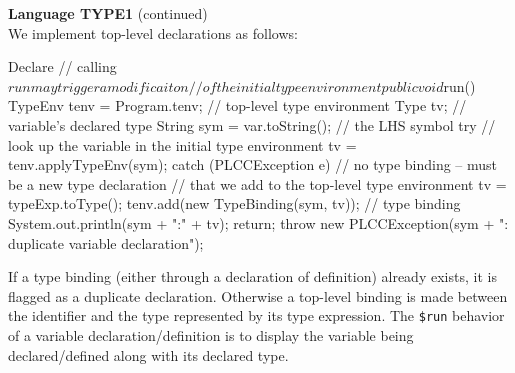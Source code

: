 \begin{minipage}[t]{\sw}
\slidenumber
\LARGE
{\bf Language TYPE1} (continued)\\[0ex]
\Large
We implement top-level declarations as follows:
{\large
\begin{qv}
Declare
    // calling $run may trigger a modificaiton
    // of the initial type environment
    public void $run() {
        TypeEnv tenv = Program.tenv; // top-level type environment
        Type tv; // variable's declared type
        String sym = var.toString(); // the LHS symbol
        try {
            // look up the variable in the initial type environment
            tv = tenv.applyTypeEnv(sym);
        } catch (PLCCException e) {
            // no type binding -- must be a new type declaration
            // that we add to the top-level type environment
            tv = typeExp.toType();
            tenv.add(new TypeBinding(sym, tv)); // type binding
            System.out.println(sym + ":" + tv);
            return;
        }
        throw new PLCCException(sym + ": duplicate variable declaration");
    }
\end{qv}
}
If a type binding
(either through a declaration of definition)
already exists, it is flagged as a duplicate declaration.
Otherwise a top-level binding is made
between the identifier and the type represented
by its type expression.
The \verb'$run' behavior of a variable declaration/definition
is to display the variable being declared/defined
along with its declared type.
\end{minipage}
